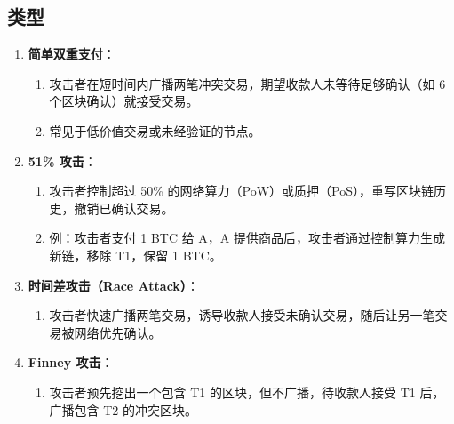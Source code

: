 \documentclass[12pt]{ctexart}
\begin{document}
\subsection{类型}
\begin{enumerate}
    \item \textbf{简单双重支付}：
        \begin{enumerate}
            \item 攻击者在短时间内广播两笔冲突交易，期望收款人未等待足够确认（如 6 个区块确认）就接受交易。
            \item 常见于低价值交易或未经验证的节点。
        \end{enumerate}
    \item \textbf{51\% 攻击}：
        \begin{enumerate}
            \item 攻击者控制超过 50\% 的网络算力（PoW）或质押（PoS），重写区块链历史，撤销已确认交易。
            \item 例：攻击者支付 1 BTC 给 A，A 提供商品后，攻击者通过控制算力生成新链，移除 T1，保留 1 BTC。
        \end{enumerate}
    \item \textbf{时间差攻击（Race Attack）}：
        \begin{enumerate}
            \item 攻击者快速广播两笔交易，诱导收款人接受未确认交易，随后让另一笔交易被网络优先确认。
        \end{enumerate}
    \item \textbf{Finney 攻击}：
        \begin{enumerate}
            \item 攻击者预先挖出一个包含 T1 的区块，但不广播，待收款人接受 T1 后，广播包含 T2 的冲突区块。
        \end{enumerate}
\end{enumerate}
\end{document}
